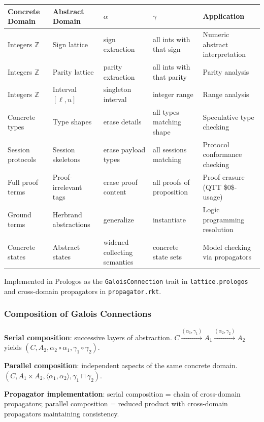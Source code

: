 \documentclass[11pt]{article}
\begin{document}
\begin{center}
\begin{tabular}{lllll}
Concrete Domain & Abstract Domain & \(\alpha\) & \(\gamma\) & Application\\
\hline
Integers \(\mathbb{Z}\) & Sign lattice & sign extraction & all ints with that sign & Numeric abstract interpretation\\
Integers \(\mathbb{Z}\) & Parity lattice & parity extraction & all ints with that parity & Parity analysis\\
Integers \(\mathbb{Z}\) & Interval \([\ell, u]\) & singleton interval & integer range & Range analysis\\
Concrete types & Type shapes & erase details & all types matching shape & Speculative type checking\\
Session protocols & Session skeletons & erase payload types & all sessions matching & Protocol conformance checking\\
Full proof terms & Proof-irrelevant tags & erase proof content & all proofs of proposition & Proof erasure (QTT \$0\$-usage)\\
Ground terms & Herbrand abstractions & generalize & instantiate & Logic programming resolution\\
Concrete states & Abstract states & widened collecting semantics & concrete state sets & Model checking via propagators\\
\end{tabular}
\end{center}

Implemented in Prologos as the \texttt{GaloisConnection} trait in \texttt{lattice.prologos} and
cross-domain propagators in \texttt{propagator.rkt}.
\subsubsection{Composition of Galois Connections}
\label{sec:orgdb4607f}

\textbf{Serial composition}: successive layers of abstraction.
\(C \xrightarrow{(\alpha_1, \gamma_1)} A_1 \xrightarrow{(\alpha_2, \gamma_2)} A_2\)
yields \((C, A_2, \alpha_2 \circ \alpha_1, \gamma_1 \circ \gamma_2)\).

\textbf{Parallel composition}: independent aspects of the same concrete domain.
\((C, A_1 \times A_2, \langle \alpha_1, \alpha_2 \rangle, \gamma_1 \sqcap \gamma_2)\).

\textbf{Propagator implementation}: serial composition = chain of cross-domain
propagators; parallel composition = reduced product with cross-domain propagators
maintaining consistency.
\end{document}
